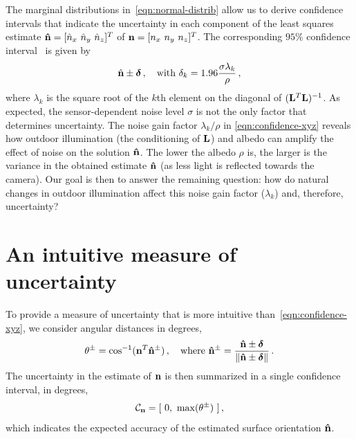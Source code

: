 The marginal distributions in~\eqref{eqn:normal-distrib} allow us to derive confidence intervals that indicate the uncertainty in each component of the least squares estimate ${\bf \hat n} = [ \hat n_x \ \hat n_y \ \hat n_z ]^T$ of ${\bf n} = [ n_x \ n_y \ n_z ]^T$. The corresponding $95\%$ confidence interval~\cite{hastie-book-09} is given by
%
\begin{equation}
\hat{\mathbf{n}} \pm \boldsymbol \delta \,, \quad \text{with } \delta_k = 1.96 \frac{\sigma\lambda_k}{\rho} \,,
\label{eqn:confidence-xyz}
\end{equation}
%
where $\lambda_k$ is the square root of the $k$th element on the diagonal of $({\bf L}^T{\bf L})^{-1}$. As expected, the sensor-dependent noise level $\sigma$ is not the only factor that determines uncertainty. The noise gain factor $\lambda_k/\rho$ in \eqref{eqn:confidence-xyz} reveals how outdoor illumination (the conditioning of ${\bf L}$) and albedo can amplify the effect of noise on the solution ${\bf \hat n}$. The lower the albedo $\rho$ is, the larger is the variance in the obtained estimate $\bf \hat n$ (as less light is reflected towards the camera). Our goal is then to answer the remaining question: how do natural changes in outdoor illumination affect this noise gain factor ($\lambda_k$) and, therefore, uncertainty?

\section{An intuitive measure of uncertainty}
\label{subsec:measure_uncertainty}

To provide a measure of uncertainty that is more intuitive than~\eqref{eqn:confidence-xyz}, we consider angular distances in degrees,
%
\begin{equation}
\theta^\pm = \cos^{-1}(\mathbf{n}^T{\bf \hat n}^\pm)\,,
\quad \text{where }
{\bf \hat n}^\pm = \frac{{\bf \hat n} \pm \boldsymbol \delta}{\lVert{\bf \hat n} \pm \boldsymbol \delta \rVert}\,.
\label{eqn:angular-dist}
\end{equation}
%
The uncertainty in the estimate of ${\bf n}$ is then summarized in a single confidence interval, in degrees,
%
\begin{equation}
\mathcal{C}_{\bf n} = [ \ 0, \ \max (\theta^\pm) \ ]\,,
\label{eqn:confidence-degrees}
\end{equation}
which indicates the expected accuracy of the estimated surface orientation ${\bf \hat n}$.

